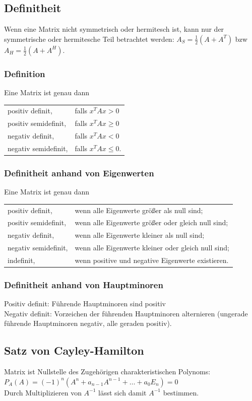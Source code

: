 \subsection{Definitheit}
Wenn eine Matrix nicht symmetrisch oder hermitesch ist, kann nur der symmetrische oder
hermitesche Teil betrachtet werden: $A_S=\frac{1}{2} (A+A^T)$ bzw $A_H=\frac{1}{2}(A+A^H)$.

\subsubsection{Definition}
Eine Matrix ist genau dann\\
\begin{tabular}{l l}
    positiv definit,	    &falls $x^{T}Ax>0$\\
    positiv semidefinit,	&falls  $x^{T}Ax\geq 0$\\
    negativ definit,	    &falls  $x^{T}Ax<0$\\
    negativ semidefinit,	&falls  $x^{T}Ax\leq 0$.
\end{tabular}

\subsubsection{Definitheit anhand von Eigenwerten}
Eine Matrix ist genau dann\\
\begin{tabular}{l l}
    positiv definit,        &wenn alle Eigenwerte größer als null sind;\\
    positiv semidefinit,	&wenn alle Eigenwerte größer oder gleich null sind;\\
    negativ definit,        &wenn alle Eigenwerte kleiner als null sind;\\
    negativ semidefinit,	&wenn alle Eigenwerte kleiner oder gleich null sind;\\
    indefinit,	            &wenn positive und negative Eigenwerte existieren.
\end{tabular}

\subsubsection{Definitheit anhand von Hauptminoren}
Positiv definit: Führende Hauptminoren sind positiv\\
Negativ definit: Vorzeichen der führenden Hauptminoren alternieren
(ungerade führende Hauptminoren negativ, alle geraden positiv).

\subsection{Satz von Cayley-Hamilton}
Matrix ist Nullstelle des Zugehörigen charakteristischen Polynoms:\\
$P_A(A) = (-1)^n(A^n + a_{n-1}A^{n-1}+\dots+a_0E_n)=0$\\
Durch Multiplizieren von $A^{-1}$ lässt sich damit $A^{-1}$ bestimmen.

